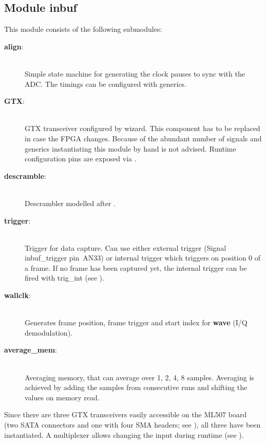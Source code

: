\documentclass[11pt,technote,a4paper,onecolumn,dvips]{IEEEtran}
\newcommand{\signal}[1]{{\ttfamily #1}}
\newcommand{\module}[1]{{\ttfamily\bfseries #1}}
\begin{document}
\subsection{Module \module{inbuf}}
\label{sec:inbuf}
This module consists of the following submodules:
\begin{description}
    \item[\module{align}:] \hfill \\
        Simple state machine for generating the clock pauses to sync with
        the ADC. The timings can be configured with generics.
    \item[\module{GTX}:] \hfill \\
        GTX transceiver \cite{gtx} configured by wizard\cite{gtx_wizard}. This component has to be
        replaced in case the FPGA changes. Because of the abundant number of
        signals and generics instantiating this module by hand is not advised.
        Runtime configuration pins are exposed via .
    \item[\module{descramble}:] \hfill \\
        Descrambler modelled after \cite[p. 28]{ltc2274}.
    \item[\module{trigger}:] \hfill \\
        Trigger for data capture. Can use either external trigger (Signal
        \signal{inbuf\_trigger} pin~AN33) or internal trigger which triggers
        on position 0 of a frame. If no frame has been captured yet, the
        internal trigger can be fired with \signal{trig\_int} (see ).
    \item[\module{wallclk}:] \hfill \\
        Generates frame position, frame trigger and start index for \module{wave}
        (I/Q demodulation).
    \item[\module{average\_mem}:] \hfill \\
        Averaging memory, that can average over 1, 2, 4, 8 samples. Averaging
        is achieved by adding the samples from consecutive runs and shifting
        the values on memory read.
\end{description}
Since there are three GTX transceivers \cite{gtx} easily accessible on the ML507 board
(two SATA connectors and one with four SMA headers; see \cite{ml507}), all
three have been instantiated. A multiplexer allows changing the input during
runtime (see ).
\end{document}
